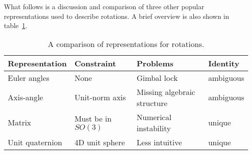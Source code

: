 		What follows is a discussion and comparison of three other popular representations used to describe rotations.
		A brief overview is also shown in table~\ref{tbl:comparison_representations_of_rotations}.
		\begin{table}
			\small
			\begin{center}
				\begin{tabular}{llll}
					\toprule
					Representation	& Constraint 			& Problems 				& Identity			\\
					\midrule
					Euler angles 	& None 					& Gimbal lock 			& ambiguous 		\\
					Axis-angle 		& Unit-norm axis 		& Missing algebraic structure						& ambiguous 		\\
					Matrix 			& Must be in $SO(3)$ 	& Numerical instability	& unique 			\\
					Unit quaternion & 4D unit sphere 		& Less intuitive 		& unique			\\
					\bottomrule
				\end{tabular}
			\end{center}
			\caption[A comparison of representations for rotations]
					{A comparison of representations for rotations.
					 \label{tbl:comparison_representations_of_rotations}}
		\end{table}
	
